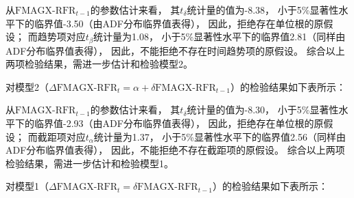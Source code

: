 \documentclass[UTF8]{ctexart}
\begin{document}
从$\text{FMAGX-RFR}_{t-1}$的参数估计来看，
其$t_{\delta}$统计量的值为-8.38，
小于5\%显著性水平下的临界值-3.50（由ADF分布临界值表得），
因此，拒绝存在单位根的原假设；
而趋势项对应$t_{\beta}$统计量为1.08，
小于5\%显著性水平下的临界值2.81（同样由ADF分布临界值表得），
因此，不能拒绝不存在时间趋势项的原假设。
综合以上两项检验结果，需进一步估计和检验模型2。

对模型2（$\Delta \text{FMAGX-RFR}_{t} = \alpha + \delta  \text{FMAGX-RFR}_{t-1}$）的检验结果如下表所示：

从$\text{FMAGX-RFR}_{t-1}$的参数估计来看，
其$t_{\delta}$统计量的值为-8.30，
小于5\%显著性水平下的临界值-2.93（由ADF分布临界值表得），
因此，拒绝存在单位根的原假设；
而截距项对应$t_{\alpha}$统计量为1.37，
小于5\%显著性水平下的临界值2.56（同样由ADF分布临界值表得），
因此，不能拒绝不存在截距项的原假设。
综合以上两项检验结果，需进一步估计和检验模型1。


对模型1（$\Delta \text{FMAGX-RFR}_{t} = \delta \text{FMAGX-RFR}_{t-1}$）的检验结果如下表所示：
\end{document}
